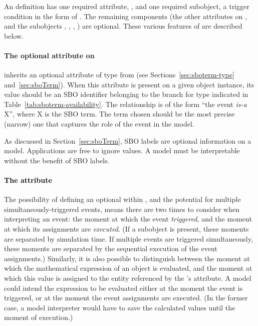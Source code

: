 \subsubsection{}

An \Event definition has one required attribute,
, and one required subobject, a
trigger condition in the form of \Trigger.  The remaining
components (the other attributes on \Event, and the subobjects
\Delay, \Priority, \ListOfEventAssignments, \EventAssignment) are
optional.  These various features of \Event are described below.


\paragraph{The optional  attribute on }
\label{sec:event-sboterm}

\Event inherits an optional  attribute of type
 from \SBase (see
Sections~\ref{sec:sboterm-type} and~\ref{sec:sboTerm}).  When this
attribute is present on a given \Event object instance, its value
should be an SBO identifier belonging to the branch for type
\Event indicated in Table~\ref{tab:sboterm-availability}.  The
relationship is of the form ``the event \emph{is-a} X'', where X
is the SBO term.  The term chosen should be the most precise
(narrow) one that captures the role of the event in the model.

As discussed in Section~\ref{sec:sboTerm}, SBO labels are optional
information on a model.  Applications are free to ignore
 values.  A model must be interpretable without the
benefit of SBO labels.


\paragraph{\textcolor{black}{The  attribute}}
\label{sec:event-usevaluesfromtriggertime}

The possibility of defining an optional \Delay within \Event, and
the potential for multiple simultaneously-triggered events, means
there are two times to consider when interpreting an event: the
moment at which the event \emph{triggered}, and the moment at
which its assignments are \emph{executed}.  (If a \Delay subobject
is present, these moments are separated by simulation time.  If
multiple events are triggered simultaneously, these moments are
separated by the sequential execution of the event assignments.)
Similarly, it is also possible to distinguish between the moment at
which the mathematical expression of an \EventAssignment object is
evaluated, and the moment at which this value is assigned to the
entity referenced by the \EventAssignment's 
attribute.  A model could intend the \EventAssignment expression
to be evaluated either at the moment the event is triggered, or at
the moment the event assignments are executed.  (In the former case,
a model interpreter would have to save the calculated values until
the moment of execution.)

